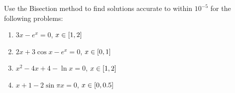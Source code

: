 \documentclass[../../Assignments.tex]{subfiles}
\begin{document}
\begin{exercise}
    Use the Bisection method to find solutions accurate to within \(10^{-5}\)
    for the following problems:

    \begin{enumerate}[label=(\alph*)]
        \item \(3x - e^x = 0\), \(x \in \interval{1}{2}\)
        \item \(2x + 3 \cos{x} -e^x = 0\), \(x \in \interval{0}{1}\)
        \item \(x^2 - 4x + 4 - \ln{x} = 0\), \(x \in \interval{1}{2}\)
        \item \(x + 1 - 2 \sin{\pi x} = 0\), \(x \in \interval{0}{\num{0.5}}\)
    \end{enumerate}
\end{exercise}
\end{document}
